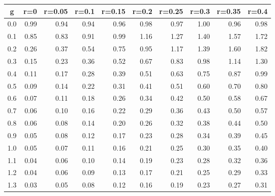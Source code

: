 %
\begin{table}[!tbp]
 \begin{center}
 \begin{tabular}{rrrrrrrrrr}\hline\hline
\multicolumn{1}{c}{g}&\multicolumn{1}{c}{r=0}&\multicolumn{1}{c}{r=0.05}&\multicolumn{1}{c}{r=0.1}&\multicolumn{1}{c}{r=0.15}&\multicolumn{1}{c}{r=0.2}&\multicolumn{1}{c}{r=0.25}&\multicolumn{1}{c}{r=0.3}&\multicolumn{1}{c}{r=0.35}&\multicolumn{1}{c}{r=0.4}\tabularnewline
\hline
0.0&0.99&0.94&0.94&0.96&0.98&0.97&1.00&0.96&0.98\tabularnewline
0.1&0.85&0.83&0.91&0.99&1.16&1.27&1.40&1.57&1.72\tabularnewline
0.2&0.26&0.37&0.54&0.75&0.95&1.17&1.39&1.60&1.82\tabularnewline
0.3&0.15&0.23&0.36&0.52&0.67&0.83&0.98&1.14&1.30\tabularnewline
0.4&0.11&0.17&0.28&0.39&0.51&0.63&0.75&0.87&0.99\tabularnewline
0.5&0.09&0.14&0.22&0.31&0.41&0.51&0.60&0.70&0.80\tabularnewline
0.6&0.07&0.11&0.18&0.26&0.34&0.42&0.50&0.58&0.67\tabularnewline
0.7&0.06&0.10&0.16&0.22&0.29&0.36&0.43&0.50&0.57\tabularnewline
0.8&0.06&0.08&0.14&0.20&0.26&0.32&0.38&0.44&0.50\tabularnewline
0.9&0.05&0.08&0.12&0.17&0.23&0.28&0.34&0.39&0.45\tabularnewline
1.0&0.05&0.07&0.11&0.16&0.21&0.25&0.30&0.35&0.40\tabularnewline
1.1&0.04&0.06&0.10&0.14&0.19&0.23&0.28&0.32&0.36\tabularnewline
1.2&0.04&0.06&0.09&0.13&0.17&0.21&0.25&0.29&0.33\tabularnewline
1.3&0.03&0.05&0.08&0.12&0.16&0.19&0.23&0.27&0.31\tabularnewline
\hline
\end{tabular}

\end{center}

\end{table}


